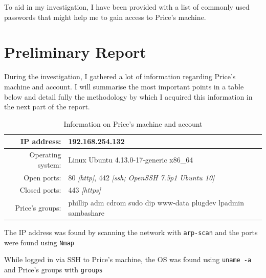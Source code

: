 \documentclass[12pt]{report}
\newcommand{\term}[1]{\colorbox{light-gray}{\texttt{#1}}}
\begin{document}
To aid in my investigation, I have been provided with a list of commonly used passwords that might help me to gain access to Price's machine.




\pagebreak
\chapter{Preliminary Report}
During the investigation, I gathered a lot of information regarding Price's machine and account. I will summarise the most important points in a table below and detail fully the methodology by which I acquired this information in the next part of the report.

\begin{table}[h!]
  \centering
  \begin{tabular}{|r l|}
    \hline
    IP address: & 192.168.254.132 \\
    \hline
    Operating system: & Linux Ubuntu 4.13.0-17-generic x86\_64 \\
    \hline
    Open ports: & 80 \textit{[http]}, 442 \textit{[ssh; OpenSSH 7.5p1 Ubuntu 10]} \\
    \hline
    Closed ports: & 443 \textit{[https]} \\
    \hline
    Price's groups: & phillip adm cdrom sudo dip www-data plugdev lpadmin sambashare \\
    \hline
  \end{tabular}
  \caption{Information on Price's machine and account}
  \label{table:pricemachineinfo}
\end{table}

The IP address was found by scanning the network with \texttt{arp-scan} and the ports were found using \texttt{Nmap}

While logged in via SSH to Price's machine, the OS was found using \term{uname -a} and Price's groups with \term{groups}
\end{document}
